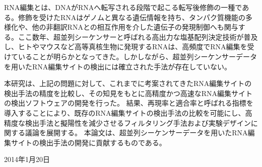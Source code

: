 \begin{jabstract}
RNA編集とは、DNAがRNAへ転写される段階で起こる転写後修飾の一種である。修飾を受けたRNAはゲノムと異なる遺伝情報を持ち、タンパク質機能の多様化や、他の非翻訳RNAとの相互作用を介した遺伝子の発現制御へも関与する。ここ数年、超並列シーケンサーと呼ばれる高出力な塩基配列決定技術が普及し、ヒトやマウスなど高等真核生物に発現するRNAは、高頻度でRNA編集を受けていることが明らかとなってきた。しかしながら、超並列シーケンサーデータを用いたRNA編集サイトの検出には確立された手法が存在していない。
\par
本研究は、上記の問題に対して、これまでに考案されてきたRNA編集サイトの検出手法の精度を比較し、その知見をもとに高精度かつ高速なRNA編集サイトの検出ソフトウェアの開発を行った。
結果、再現率と適合率と呼ばれる指標を導入することにより、既存のRNA編集サイトの検出手法の比較を可能にし、高精度な検出手法と擬陽性を減少させるフィルタリング手法および実験デザインに関する議論を展開する。
本論文は、超並列シーケンサーデータを用いたRNA編集サイトの検出手法の開発に貢献するものである。
\end{jabstract}

\begin{flushright}
	\par
	2014年1月20日
\end{flushright}